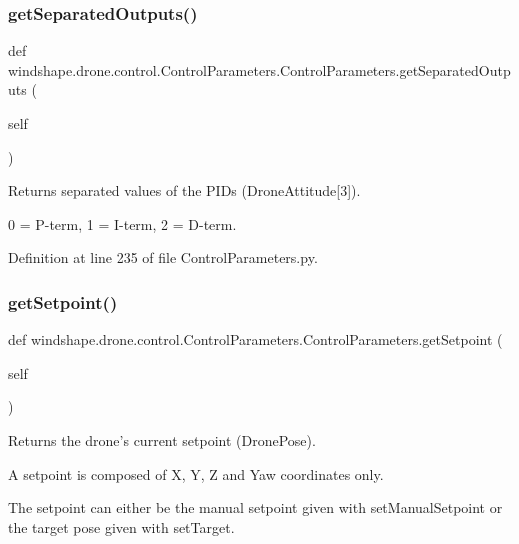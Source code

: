\subsubsection{\texorpdfstring{get\+Separated\+Outputs()}{getSeparatedOutputs()}}
{\footnotesize\ttfamily def windshape.\+drone.\+control.\+Control\+Parameters.\+Control\+Parameters.\+get\+Separated\+Outputs (\begin{DoxyParamCaption}\item[{}]{self }\end{DoxyParamCaption})}

\begin{DoxyVerb}Returns separated values of the PIDs (DroneAttitude[3]).

0 = P-term, 1 = I-term, 2 = D-term.
\end{DoxyVerb}
 

Definition at line 235 of file Control\+Parameters.\+py.

\mbox{\label{classwindshape_1_1drone_1_1control_1_1_control_parameters_1_1_control_parameters_a77ec0624c7be3521665eaab88ff7f6ed}} 
\subsubsection{\texorpdfstring{get\+Setpoint()}{getSetpoint()}}
{\footnotesize\ttfamily def windshape.\+drone.\+control.\+Control\+Parameters.\+Control\+Parameters.\+get\+Setpoint (\begin{DoxyParamCaption}\item[{}]{self }\end{DoxyParamCaption})}

\begin{DoxyVerb}Returns the drone's current setpoint (DronePose).

A setpoint is composed of X, Y, Z and Yaw coordinates only.

The setpoint can either be the manual setpoint given with
setManualSetpoint or the target pose given with setTarget.
\end{DoxyVerb}
 

